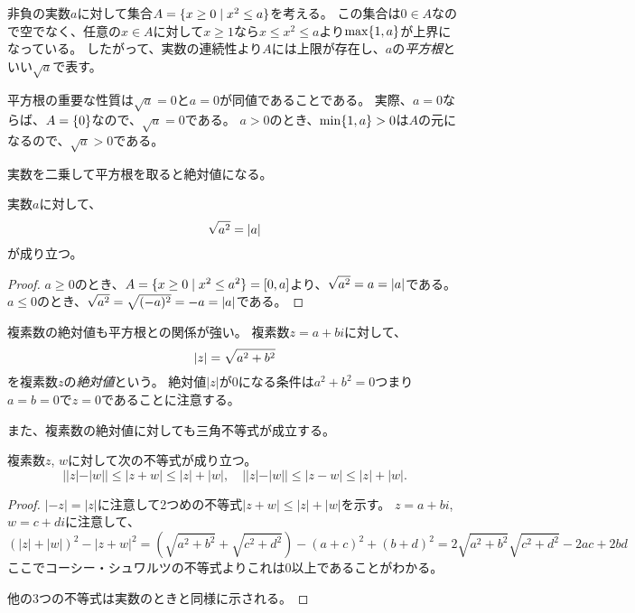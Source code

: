 非負の実数$a$に対して集合$A = \{ x \ge 0 \mid x^2 \le a \}$を考える。
この集合は$0 \in A$なので空でなく、任意の$x \in A$に対して$x \ge 1$なら$x \le x^2 \le a$より$\max\{ 1, a \}$が上界になっている。
したがって、実数の連続性より$A$には上限が存在し、$a$の\emph{平方根}といい$\sqrt{a}$で表す。

平方根の重要な性質は$\sqrt{a} = 0$と$a = 0$が同値であることである。
実際、$a = 0$ならば、$A = \{ 0 \}$なので、$\sqrt{a} = 0$である。
$a > 0$のとき、$\min\{ 1, a \} > 0$は$A$の元になるので、$\sqrt{a} > 0$である。

実数を二乗して平方根を取ると絶対値になる。

\begin{proposition}[平方根と実数の絶対値]
実数$a$に対して、
$$
\sqrt{a^2} = \abs{a}
$$
が成り立つ。
\end{proposition}

\begin{proof}
$a \ge 0$のとき、$A = \{ x \ge 0 \mid x^2 \le a^2 \} = [0, a]$より、$\sqrt{a^2} = a = \abs{a}$である。
$a \le 0$のとき、$\sqrt{a^2} = \sqrt{(-a)^2} = -a = \abs{a}$である。
\end{proof}

複素数の絶対値も平方根との関係が強い。
複素数$z = a+b i$に対して、
$$
\abs{z} = \sqrt{a^2+b^2}
$$
を複素数$z$の\emph{絶対値}という。
絶対値$|z|$が$0$になる条件は$a^2+b^2 = 0$つまり$a = b = 0$で$z = 0$であることに注意する。

また、複素数の絶対値に対しても三角不等式が成立する。

\begin{proposition}[複素数の絶対値の三角不等式]
複素数$z$, $w$に対して次の不等式が成り立つ。
$$
||z|-|w|| \le |z+w| \le |z|+|w|,
\quad ||z|-|w|| \le |z-w| \le |z|+|w|.
$$
\end{proposition}

\begin{proof}
$|-z| = |z|$に注意して2つめの不等式$|z+w| \le |z|+|w|$を示す。
$z = a+b i$, $w = c+d i$に注意して、
$$
(|z|+|w|)^2-|z+w|^2
= (\sqrt{a^2+b^2}+\sqrt{c^2+d^2})-(a+c)^2+(b+d)^2
= 2\sqrt{a^2+b^2}\sqrt{c^2+d^2}-2 a c+2 b d
$$
ここでコーシー・シュワルツの不等式よりこれは$0$以上であることがわかる。

他の3つの不等式は実数のときと同様に示される。
\end{proof}
